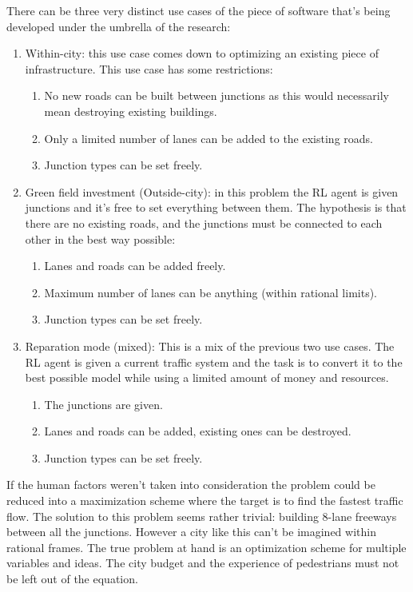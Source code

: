 \documentclass[
]{elteikthesis}[2023/04/10]
\begin{document}
There can be three very distinct use cases of the piece of software
that's being developed under the umbrella of the research:
\begin{enumerate}
\item Within-city: this use case comes down to optimizing an existing piece
of infrastructure. This use case has some restrictions: 
\begin{enumerate}
\item No new roads can be built between junctions as this would necessarily
mean destroying existing buildings. 
\item Only a limited number of lanes can be added to the existing roads. 
\item Junction types can be set freely. 
\end{enumerate}
\item Green field investment (Outside-city): in this problem the RL agent
is given junctions and it's free to set everything between them. The
hypothesis is that there are no existing roads, and the junctions
must be connected to each other in the best way possible:
\begin{enumerate}
\item Lanes and roads can be added freely.
\item Maximum number of lanes can be anything (within rational limits).
\item Junction types can be set freely. 
\end{enumerate}
\item Reparation mode (mixed): This is a mix of the previous two use cases.
The RL agent is given a current traffic system and the task is to
convert it to the best possible model while using a limited amount
of money and resources.
\begin{enumerate}
\item The junctions are given. 
\item Lanes and roads can be added, existing ones can be destroyed. 
\item Junction types can be set freely.
\end{enumerate}
\end{enumerate}
If the human factors weren't taken into consideration the problem
could be reduced into a maximization scheme where the target is to
find the fastest traffic flow. The solution to this problem seems
rather trivial: building 8-lane freeways between all the junctions. 
However a city like this can't be imagined within rational frames.
The true problem at hand is an optimization scheme for multiple variables
and ideas. The city budget and the experience of pedestrians must not be left
out of the equation. 
\end{document}
